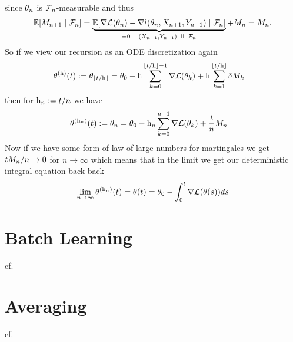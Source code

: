 since \(\theta_n\) is \(\mathcal{F}_n\)-measurable and thus
\begin{align*}
	\mathbb{E}[M_{n+1}\mid \mathcal{F}_n]
	= \underbrace{\mathbb{E}[\nabla\mathcal{L}(\theta_n) - \nabla l(\theta_n, X_{n+1}, Y_{n+1})\mid \mathcal{F}_n]}_{
		=0 \quad (X_{n+1},Y_{n+1}) \mathrel{\;\perp \!\!\! \perp\;} \mathcal{F}_n
	} + M_n
	= M_n.
\end{align*}
%
So if we view our recursion as an ODE discretization again
%
\begin{align*}
	\theta^{(\text{h})}(t) &:= \theta_{\lfloor t/\text{h}\rfloor}
	= \theta_0 - \text{h}\sum_{k=0}^{\lfloor t/\text{h}\rfloor-1}\nabla\mathcal{L}(\theta_k)
	+ \text{h}\sum_{k=1}^{\lfloor t/\text{h}\rfloor}\delta M_k
\end{align*}
%
then for \(\text{h}_n := t/n\) we have
\begin{align*}
	\theta^{(\text{h}_n)}(t) &:= \theta_n
	= \theta_0 - \text{h}_n\sum_{k=0}^{n-1}\nabla\mathcal{L}(\theta_k)
	+\frac{t}{n}M_n
\end{align*}
Now if we have some form of law of large numbers for martingales we get
\(tM_n/n\to 0\) for \(n\to\infty\) which means that in the limit we
get our deterministic integral equation back back
\begin{align*}
	\lim_{n\to\infty}\theta^{(\text{h}_n)}(t) = \theta(t)
	= \theta_0 - \int_0^t \nabla\mathcal{L}(\theta(s))ds
\end{align*}

\section{Batch Learning}

cf. \cite{hardtTrainFasterGeneralize2016} \cite{hofferTrainLongerGeneralize2018}

\section{Averaging}

cf. \cite{bachNonstronglyconvexSmoothStochastic2013}


\endinput
